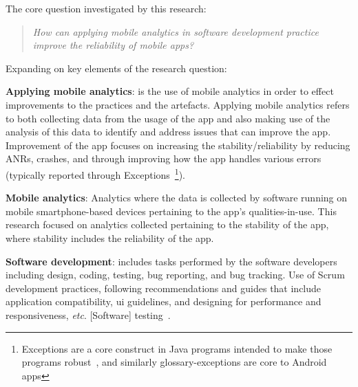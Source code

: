 The core question investigated by this research:

\begin{quote}
  \emph{How can applying mobile analytics in software development practice improve the reliability of mobile apps?}~\label{overall-research-question}
\end{quote}

Expanding on key elements of the research question:
    
\textbf{Applying mobile analytics}: is the use of mobile analytics in order to effect improvements to the practices and the artefacts. Applying mobile analytics refers to both collecting data from the usage of the app and also making use of the analysis of this data to identify and address issues that can improve the app. Improvement of the app focuses on increasing the stability/reliability by reducing ANRs, crashes, and through improving how the app handles various errors (typically reported through Exceptions~\footnote{Exceptions are a core construct in Java programs intended to make those programs robust~\cite{robillard2000_designing_robust_java_programs_with_exceptions}, and similarly \glspl{glossary-exception} are core to Android apps}).
    
\textbf{Mobile analytics}: Analytics where the data is collected by software running on mobile smartphone-based devices pertaining to the app's qualities-in-use. This research focused on analytics collected pertaining to the stability of the app, where stability includes the reliability of the app.
    
\textbf{Software development}: includes tasks performed by the software developers including design, coding, testing, bug reporting, and bug tracking.  Use of Scrum development practices, following recommendations and guides that include application compatibility, \gls{ui} guidelines, and designing for performance and responsiveness, \emph{etc}. [Software] testing~.~

